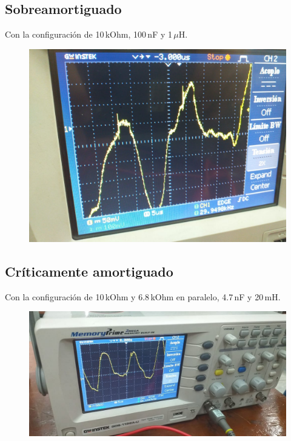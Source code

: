 \documentclass[a4paper,12pt]{report}
\begin{document}
\subsection{Sobreamortiguado}
Con la configuración de 10$\,$kOhm, 100$\,$nF y 1$\,\mu$H.
\begin{figure}[H]
\begin{center}
\includegraphics[scale=0.24]{sob.jpeg}
\end{center}
\end{figure}
\subsection{Críticamente amortiguado}
Con la configuración de 10$\,$kOhm y 6.8$\,$kOhm en paralelo, 4.7$\,$nF y 20$\,$mH.
\begin{figure}[H]
\begin{center}
\includegraphics[scale=0.33]{crit.jpeg}
\end{center}
\end{figure}
\newpage
\end{document}
